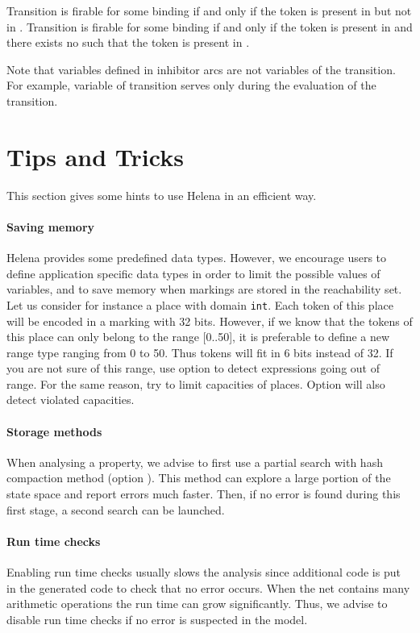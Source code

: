 Transition  is firable for some binding  if and only if
the token  is present in  but not in .
Transition  is firable for some binding  if and only if
the token  is present in  and there exists no 
such that the token  is present in .

Note that variables defined in inhibitor arcs are not variables of the
transition.  For example, variable  of transition  serves
only during the evaluation of the transition.

\section{Tips and Tricks}
This section gives some hints to use Helena in an efficient way.


\paragraph{Saving memory}
Helena provides some predefined data types. However, we encourage
users to define application specific data types in order to limit the
possible values of variables, and to save memory when markings are
stored in the reachability set. Let us consider for instance a place
with domain \texttt{int}. Each token of this place will be encoded in
a marking with 32 bits. However, if we know that the tokens of this
place can only belong to the range [0..50], it is preferable to define
a new range type ranging from 0 to 50. Thus tokens will fit in 6 bits
instead of 32. If you are not sure of this range, use option
 to detect expressions going out of
range. For the same reason, try to limit capacities of places. Option
 will also detect violated capacities.


\paragraph{Storage methods}
When analysing a property, we advise to first use a partial search
with hash compaction method (option ).  This
method can explore a large portion of the state space and report
errors much faster.  Then, if no error is found during this first
stage, a second search can be launched.


\paragraph{Run time checks}
Enabling run time checks usually slows the analysis since additional
code is put in the generated code to check that no error occurs. When
the net contains many arithmetic operations the run time can grow
significantly. Thus, we advise to disable run time checks if no error
is suspected in the model.


